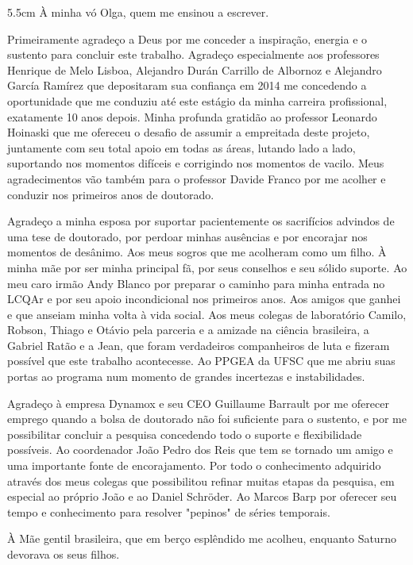 
\begin{dedicatoria}
	\vspace*{\fill}
	\noindent
	\begin{adjustwidth*}{}{5.5cm}     
		À minha vó Olga, quem me ensinou a escrever.
	\end{adjustwidth*}
\end{dedicatoria}

\begin{agradecimentos}
	Primeiramente agradeço a Deus por me conceder a inspiração, energia e o sustento para concluir este trabalho. Agradeço especialmente aos professores Henrique de Melo Lisboa, Alejandro Durán Carrillo de Albornoz e Alejandro García Ramírez que depositaram sua confiança em 2014 me concedendo a oportunidade que me conduziu até este estágio da minha carreira profissional, exatamente 10 anos depois. Minha profunda gratidão ao professor Leonardo Hoinaski que me ofereceu o desafio de assumir a empreitada deste projeto, juntamente com seu total apoio em todas as áreas, lutando lado a lado, suportando nos momentos difíceis e corrigindo nos momentos de vacilo. Meus agradecimentos vão também para o professor Davide Franco por me acolher e conduzir nos primeiros anos de doutorado. 

	Agradeço a minha esposa por suportar pacientemente os sacrifícios advindos de uma tese de doutorado, por perdoar minhas ausências e por encorajar nos momentos de desânimo. Aos meus sogros que me acolheram como um filho. À minha mãe por ser minha principal fã, por seus conselhos e seu sólido suporte. Ao meu caro irmão Andy Blanco por preparar o caminho para minha entrada no LCQAr e por seu apoio incondicional nos primeiros anos. Aos amigos que ganhei e que anseiam minha volta à vida social. Aos meus colegas de laboratório Camilo, Robson, Thiago e Otávio pela parceria e a amizade na ciência brasileira, a Gabriel Ratão e a Jean, que foram verdadeiros companheiros de luta e fizeram possível que este trabalho acontecesse. Ao PPGEA da UFSC que me abriu suas portas ao programa num momento de grandes incertezas e instabilidades.

	Agradeço à empresa Dynamox e seu CEO Guillaume Barrault por me oferecer emprego quando a bolsa de doutorado não foi suficiente para o sustento, e por me possibilitar concluir a pesquisa concedendo todo o suporte e flexibilidade possíveis. Ao coordenador João Pedro dos Reis que tem se tornado um amigo e uma importante fonte de encorajamento. Por todo o conhecimento adquirido através dos meus colegas que possibilitou refinar muitas etapas da pesquisa, em especial ao próprio João e ao Daniel Schröder. Ao Marcos Barp por oferecer seu tempo e conhecimento para resolver "pepinos" de séries temporais.

	À Mãe gentil brasileira, que em berço esplêndido me acolheu, enquanto Saturno devorava os seus filhos.
\end{agradecimentos}

